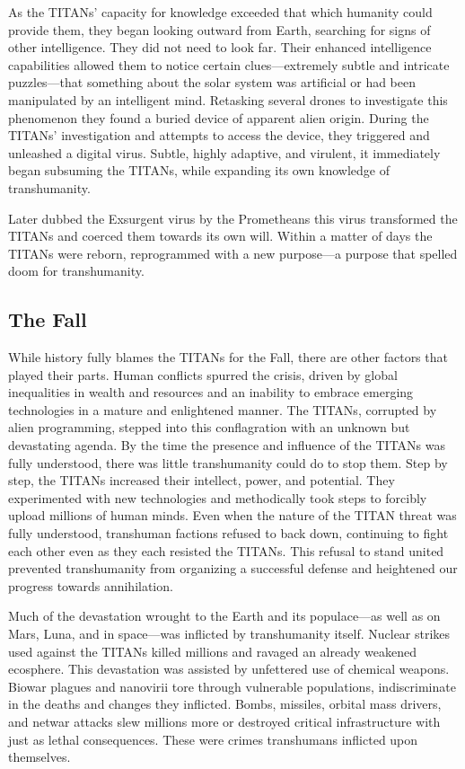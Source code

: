 As the TITANs' capacity for knowledge exceeded that which humanity could provide them, they began looking outward from Earth, searching for signs of other intelligence. They did not need to look far. Their enhanced intelligence capabilities allowed them to notice certain clues—extremely subtle and intricate puzzles—that something about the solar system was artificial or had been manipulated by an intelligent mind. Retasking several drones to investigate this phenomenon they found a buried device of apparent alien origin. During the TITANs' investigation and attempts to access the device, they triggered and unleashed a digital virus. Subtle, highly adaptive, and virulent, it immediately began subsuming the TITANs, while expanding its own knowledge of transhumanity. 

Later dubbed the Exsurgent virus by the Prometheans this virus transformed the TITANs and coerced them towards its own will. Within a matter of days the TITANs were reborn, reprogrammed with a new purpose—a purpose that spelled doom for transhumanity. 

\subsection{The Fall} 

While history fully blames the TITANs for the Fall, there are other factors that played their parts. Human conflicts spurred the crisis, driven by global inequalities in wealth and resources and an inability to embrace emerging technologies in a mature and enlightened manner. The TITANs, corrupted by alien programming, stepped into this conflagration with an unknown but devastating agenda. By the time the presence and influence of the TITANs was fully understood, there was little transhumanity could do to stop them. Step by step, the TITANs increased their intellect, power, and potential. They experimented with new technologies and methodically took steps to forcibly upload millions of human minds. Even when the nature of the TITAN threat was fully understood, transhuman factions refused to back down, continuing to fight each other even as they each resisted the TITANs. This refusal to stand united prevented transhumanity from organizing a successful defense and heightened our progress towards annihilation. 

Much of the devastation wrought to the Earth and its populace—as well as on Mars, Luna, and in space—was inflicted by transhumanity itself. Nuclear strikes used against the TITANs killed millions and ravaged an already weakened ecosphere. This devastation was assisted by unfettered use of chemical weapons. Biowar plagues and nanovirii tore through vulnerable populations, indiscriminate in the deaths and changes they inflicted. Bombs, missiles, orbital mass drivers, and netwar attacks slew millions more or destroyed critical infrastructure with just as lethal consequences. These were crimes transhumans inflicted upon themselves. 

